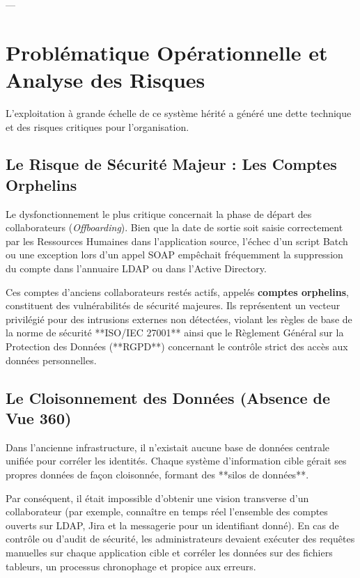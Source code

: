 ---

\section{Problématique Opérationnelle et Analyse des Risques}
\label{sec:problematique}

L'exploitation à grande échelle de ce système hérité a généré une dette technique et des risques critiques pour l'organisation.

\subsection{Le Risque de Sécurité Majeur : Les Comptes Orphelins}
Le dysfonctionnement le plus critique concernait la phase de départ des collaborateurs (\textit{Offboarding}). Bien que la date de sortie soit saisie correctement par les Ressources Humaines dans l'application source, l'échec d'un script Batch ou une exception lors d'un appel SOAP empêchait fréquemment la suppression du compte dans l'annuaire LDAP ou dans l'Active Directory. 

Ces comptes d'anciens collaborateurs restés actifs, appelés \textbf{comptes orphelins}, constituent des vulnérabilités de sécurité majeures. Ils représentent un vecteur privilégié pour des intrusions externes non détectées, violant les règles de base de la norme de sécurité **ISO/IEC 27001** ainsi que le Règlement Général sur la Protection des Données (**RGPD**) concernant le contrôle strict des accès aux données personnelles.

\subsection{Le Cloisonnement des Données (Absence de Vue 360)}
Dans l'ancienne infrastructure, il n'existait aucune base de données centrale unifiée pour corréler les identités. Chaque système d'information cible gérait ses propres données de façon cloisonnée, formant des **silos de données**. 

Par conséquent, il était impossible d'obtenir une vision transverse d'un collaborateur (par exemple, connaître en temps réel l'ensemble des comptes ouverts sur LDAP, Jira et la messagerie pour un identifiant donné). En cas de contrôle ou d'audit de sécurité, les administrateurs devaient exécuter des requêtes manuelles sur chaque application cible et corréler les données sur des fichiers tableurs, un processus chronophage et propice aux erreurs.

